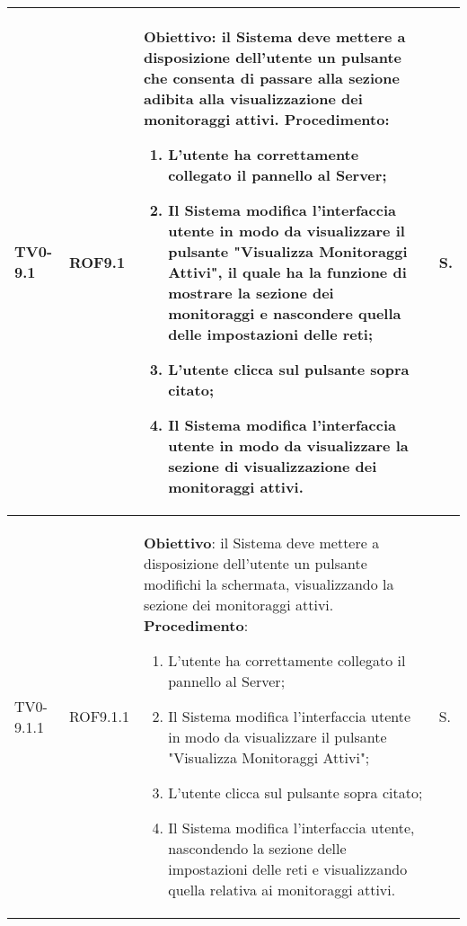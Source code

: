 \begin{longtable}{|C{.15\textwidth}|C{.13\textwidth}|m{.65\textwidth}|C{.08\textwidth}|}
TV0-9.1 & ROF9.1 &
	\textbf{Obiettivo}: il Sistema deve mettere a disposizione dell'utente un pulsante che consenta di passare alla sezione adibita alla visualizzazione dei monitoraggi attivi. \newline
	\textbf{Procedimento}:
	\begin{enumerate}
		\item L'utente ha correttamente collegato il pannello al Server;
		\item Il Sistema modifica l'interfaccia utente in modo da visualizzare il pulsante "Visualizza Monitoraggi Attivi", il quale ha la funzione di mostrare la sezione dei monitoraggi e nascondere quella delle impostazioni delle reti;
		\item L'utente clicca sul pulsante sopra citato;
		\item Il Sistema modifica l'interfaccia utente in modo da visualizzare la sezione di visualizzazione dei monitoraggi attivi.
	\end{enumerate}
	& S. \\
\hline	

TV0-9.1.1 & ROF9.1.1 &
	\textbf{Obiettivo}: il Sistema deve mettere a disposizione dell'utente un pulsante modifichi la schermata, visualizzando la sezione dei monitoraggi attivi. \newline
	\textbf{Procedimento}:
	\begin{enumerate}
		\item L'utente ha correttamente collegato il pannello al Server;
		\item Il Sistema modifica l'interfaccia utente in modo da visualizzare il pulsante "Visualizza Monitoraggi Attivi";
		\item L'utente clicca sul pulsante sopra citato;
		\item Il Sistema modifica l'interfaccia utente, nascondendo la sezione delle impostazioni delle reti e visualizzando quella relativa ai monitoraggi attivi.
	\end{enumerate}
	& S. \\
\hline	


\end{longtable}
